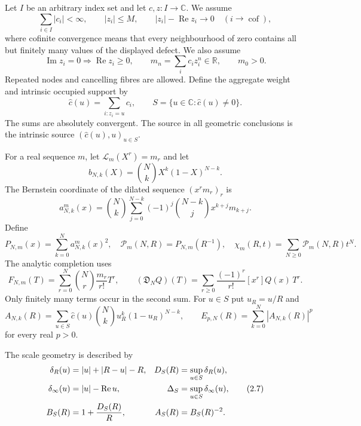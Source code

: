 \documentclass[11pt]{article}
\theoremstyle{remark}
\newcommand{\C}{\mathbb C}
\newcommand{\R}{\mathbb R}
\newcommand{\Rea}{\operatorname{Re}}
\newcommand{\Ima}{\operatorname{Im}}
\newcommand{\cof}{\operatorname{cof}}
\begin{document}
Let $I$ be an arbitrary index set and let $c,z:I\to\C$.  We assume
\begin{equation}
 \sum_{i\in I}|c_i|<\infty,\qquad |z_i|\le M,
 \qquad |z_i|-\Rea z_i\longrightarrow0\quad(i\to\cof),
 \tag{2.1}
\end{equation}
where cofinite convergence means that every neighbourhood of zero contains all but finitely many
values of the displayed defect.  We also assume
\begin{equation}
 \Ima z_i=0\Longrightarrow \Rea z_i\ge0,
 \qquad
 m_n=\sum_i c_i z_i^n\in\R,
 \qquad m_0>0.
 \tag{2.2}
\end{equation}
Repeated nodes and cancelling fibres are allowed.  Define the aggregate weight and intrinsic
occupied support by
\begin{equation}
 \widehat c(u)=\sum_{i:z_i=u}c_i,
 \qquad S=\{u\in\C:\widehat c(u)\ne0\}.
 \tag{2.3}
\end{equation}
The sums are absolutely convergent.  The source in all geometric conclusions is the intrinsic
source $(\widehat c(u),u)_{u\in S}$.

For a real sequence $m$, let $\mathcal L_m(X^r)=m_r$ and let
\[
 b_{N,k}(X)=\binom NkX^k(1-X)^{N-k}.
\]
The Bernstein coordinate of the dilated sequence $(x^rm_r)_r$ is
\begin{equation}
 a^m_{N,k}(x)
 =\binom Nk\sum_{j=0}^{N-k}(-1)^j\binom{N-k}{j}x^{k+j}m_{k+j}.
 \tag{2.4}
\end{equation}
Define
\begin{equation}
 P_{N,m}(x)=\sum_{k=0}^N a^m_{N,k}(x)^2,
 \quad
 \mathcal P_m(N,R)=P_{N,m}(R^{-1}),
 \quad
 \chi_m(R,t)=\sum_{N\ge0}\mathcal P_m(N,R)t^N.
 \tag{2.5}
\end{equation}
The analytic completion uses
\begin{equation}
 F_{N,m}(T)=\sum_{r=0}^N\binom Nr\frac{m_r}{r!}T^r,
 \qquad
 (\mathfrak D_NQ)(T)=\sum_{r\ge0}
   \frac{(-1)^r}{r!}[x^r]Q(x)\,T^r.
 \tag{2.5a}
\end{equation}
Only finitely many terms occur in the second sum.
For $u\in S$ put $u_R=u/R$ and
\begin{equation}
 A_{N,k}(R)=\sum_{u\in S}\widehat c(u)\binom Nk
      u_R^k(1-u_R)^{N-k},\qquad
 E_{p,N}(R)=\sum_{k=0}^N|A_{N,k}(R)|^p
 \tag{2.6}
\end{equation}
for every real $p>0$.

The scale geometry is described by
\begin{align}
 \delta_R(u)&=|u|+|R-u|-R,&
 D_S(R)&=\sup_{u\in S}\delta_R(u),\notag\\
 \delta_\infty(u)&=|u|-\Rea u,&
 \Delta_S&=\sup_{u\in S}\delta_\infty(u),\tag{2.7}\\
 B_S(R)&=1+\frac{D_S(R)}R,&
 A_S(R)&=B_S(R)^{-2}.\notag
\end{align}
\end{document}

